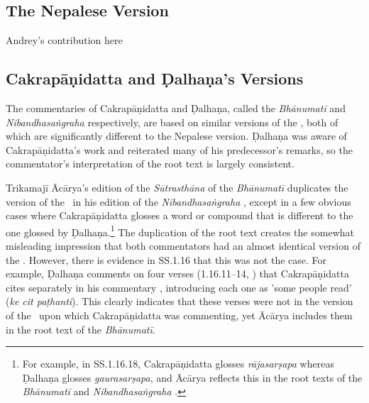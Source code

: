 \subsection{The Nepalese Version}
Andrey's contribution here

\subsection{Cakrapāṇidatta and Ḍalhaṇa's Versions}
The commentaries of Cakrapāṇidatta and Ḍalhaṇa, called the \emph{Bhānumatī} and \emph{Nibandhasaṅgraha} respectively, are based on similar versions of the \SS, both of which are significantly different to the Nepalese version. Ḍalhaṇa was aware of Cakrapāṇidatta's work and reiterated many of his predecessor's remarks, so the commentator's interpretation of the root text is largely consistent. 

Trikamajī Ācārya's edition of the \textit{Sūtrasthāna} of the \emph{Bhānumatī} \citep{acar-1939} duplicates the version of the \SS\ in his edition of the \emph{Nibandhasaṅgraha} \citep{vulgate}, except in a few obvious cases where Cakrapāṇidatta glosses a word or compound that is different to the one glossed by Ḍalhaṇa.\footnote{For example, in SS.1.16.18, Cakrapāṇidatta glosses \emph{rājasarṣapa} whereas Ḍalhaṇa glosses \emph{gaurasarṣapa}, and Ācārya reflects this in the root texts of the \emph{Bhānumatī} \citep[130]{acar-1939} and \emph{Nibandhasaṅgraha} \citep[79]{vulgate}.} The duplication of the root text creates the somewhat misleading impression that both commentators had an almost identical version of the \SS. However, there is evidence in SS.1.16 that this was not the case. For example, Ḍalhaṇa comments on four verses (1.16.11–14, \cite[78]{vulgate}) that Cakrapāṇidatta cites separately in his commentary \citep[128–129]{acar-1939}, introducing each one as 'some people read' (\emph{ke cit paṭhanti}). This clearly indicates that these verses were not in the version of the \SS\ upon which Cakrapāṇidatta was commenting, yet Ācārya includes them in the root text of the \emph{Bhānumatī}.

